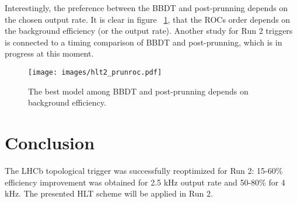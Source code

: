 \documentclass{llncs}
\begin{document}
Interestingly, the preference between the BBDT and post-prunning depends on the chosen output rate. It is clear in figure~ \ref{hlt2_prunroc}, that the ROCs order depends on the background efficiency (or the output rate). Another study for Run 2 triggers is connected to a timing comparison of BBDT and post-prunning, which is in progress at this moment.

\begin{figure}[h]
\texttt{[image: images/hlt2\_prunroc.pdf]}\hspace{2pc}%
\begin{minipage}[b]{22pc}\caption{\label{hlt2_prunroc} The best model among BBDT and post-prunning depends on background efficiency.}
\end{minipage}
\end{figure}


\section{Conclusion}
The LHCb topological trigger was successfully reoptimized for Run 2: 15-60\% efficiency improvement was obtained for 2.5 kHz output rate and 50-80\% for 4 kHz.  The presented HLT scheme will be applied in Run 2.
\end{document}
